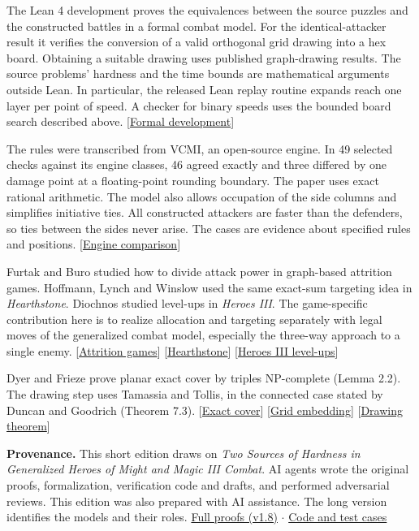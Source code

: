 \documentclass[11pt,a4paper]{article}
\newcommand{\topic}[1]{\par\addvspace{7pt}{\sffamily\bfseries\large #1\par}\nobreak\vspace{-2pt}}
\newcommand{\smallhead}[1]{{\sffamily\bfseries\color{link}#1}}
\newcommand{\edition}{https://github.com/uson1x/homm3-hardness}
\newcommand{\artifact}[2]{\href{\edition/blob/v1.8/#1}{#2}}
\newcommand{\refpaper}{\artifact{paper/main.pdf}{Full proofs (v1.8)}}
\begin{document}
\topic{What was checked}
The Lean 4 development proves the equivalences between the source puzzles and the constructed battles in a formal combat model. For the identical-attacker result it verifies the conversion of a valid orthogonal grid drawing into a hex board. Obtaining a suitable drawing uses published graph-drawing results. The source problems' hardness and the time bounds are mathematical arguments outside Lean. In particular, the released Lean replay routine expands reach one layer per point of speed. A checker for binary speeds uses the bounded board search described above. [\href{\edition/tree/v1.8/formal/lean}{Formal development}]

The rules were transcribed from VCMI, an open-source engine. In 49 selected checks against its engine classes, 46 agreed exactly and three differed by one damage point at a floating-point rounding boundary. The paper uses exact rational arithmetic. The model also allows occupation of the side columns and simplifies initiative ties. All constructed attackers are faster than the defenders, so ties between the sides never arise. The cases are evidence about specified rules and positions. [\artifact{engine-check/REPORT.md}{Engine comparison}]

\topic{Related work and full proofs}
Furtak and Buro studied how to divide attack power in graph-based attrition games. Hoffmann, Lynch and Winslow used the same exact-sum targeting idea in \emph{Hearthstone}. Diochnos studied level-ups in \emph{Heroes III}. The game-specific contribution here is to realize allocation and targeting separately with legal moves of the generalized combat model, especially the three-way approach to a single enemy. [\href{https://doi.org/10.1609/aiide.v6i1.12410}{Attrition games}] [\href{https://doi.org/10.2197/ipsjjip.28.919}{Hearthstone}] [\href{https://doi.org/10.1007/978-3-642-13122-6_16}{Heroes III level-ups}]

Dyer and Frieze prove planar exact cover by triples NP-complete (Lemma 2.2). The drawing step uses Tamassia and Tollis, in the connected case stated by Duncan and Goodrich (Theorem 7.3). [\href{https://www.math.cmu.edu/~af1p/Texfiles/3DM.pdf}{Exact cover}] [\href{https://doi.org/10.1109/31.34669}{Grid embedding}] [\href{https://cs.brown.edu/people/rtamassi/gdhandbook/chapters/orthogonal.pdf}{Drawing theorem}]

{\small \smallhead{Provenance.} This short edition draws on \emph{Two Sources of Hardness in Generalized Heroes of Might and Magic III Combat}. AI agents wrote the original proofs, formalization, verification code and drafts, and performed adversarial reviews. This edition was also prepared with AI assistance. The long version identifies the models and their roles. \refpaper{} $\cdot$ \href{\edition/tree/v1.8}{Code and test cases}\par}
\end{document}
